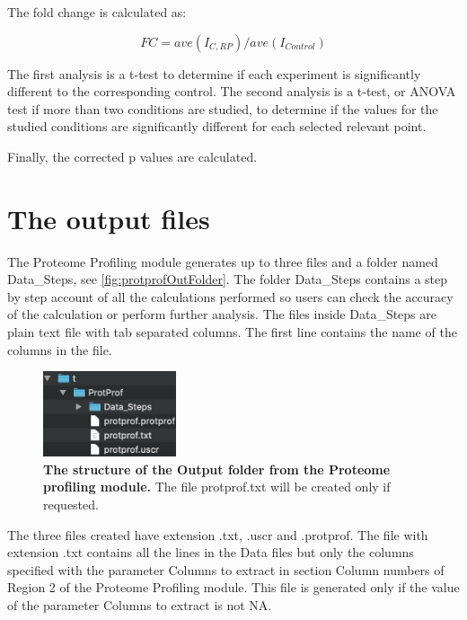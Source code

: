 The fold change is calculated as: 

\begin{equation}
\label{eq:protprofFC}
FC = ave(I_{C, RP}) / ave(I_{Control})
\end{equation}

The first analysis is a t-test to determine if each experiment is significantly different to the corresponding control. The second analysis is a t-test, or ANOVA test if more than two conditions are studied, to determine if the values for the studied conditions are significantly different for each selected relevant point.

Finally, the corrected p values are calculated.

\section{The output files}

The Proteome Profiling module generates up to three files and a folder named Data\_Steps, see \autoref{fig:protprofOutFolder}. The folder Data\_Steps contains a step by step account of all the calculations performed so users can check the accuracy of the calculation or perform further analysis. The files inside Data\_Steps are plain text file with tab separated columns. The first line contains the name of the columns in the file.  

\begin{figure}[h]
	\centering
	\includegraphics[width=0.35\textwidth]{./IMAGES/MOD-PROTPROF/protprof-files.jpg}	    
	\caption[The structure of the Output folder from the Proteome Profiling module]{\textbf{The structure of the Output folder from the Proteome profiling module.} The file protprof.txt will be created only if requested.} 
	\label{fig:protprofOutFolder}
	\vspace{-5pt} 	
\end{figure}

The three files created have extension .txt, .uscr and .protprof. The file with extension .txt contains all the lines in the Data files but only the columns specified with the parameter Columns to extract in section Column numbers of Region \num{2} of the Proteome Profiling module. This file is generated only if the value of the parameter Columns to extract is not NA. 

